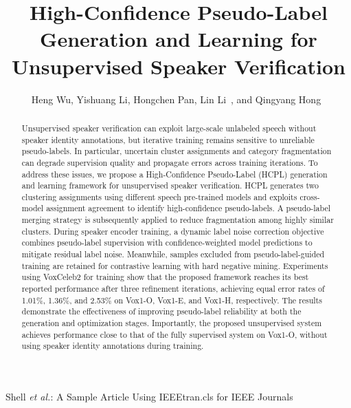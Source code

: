 \documentclass[lettersize,journal]{IEEEtran}
\begin{document}
\title{High-Confidence Pseudo-Label Generation and Learning for  Unsupervised Speaker Verification}

\author{Heng Wu, Yishuang Li, Hongchen Pan, Lin Li~, and Qingyang Hong~
}

%
{Shell \MakeLowercase{\textit{et al.}}: A Sample Article Using IEEEtran.cls for IEEE Journals}


\maketitle

\begin{abstract}
Unsupervised speaker verification can exploit large-scale unlabeled
speech without speaker identity annotations, but iterative training
remains sensitive to unreliable pseudo-labels. In particular,
uncertain cluster assignments and category fragmentation can degrade
supervision quality and propagate errors across training iterations.
To address these issues, we propose a High-Confidence Pseudo-Label
(HCPL) generation and learning framework for unsupervised speaker
verification.
HCPL generates two clustering assignments using different speech
pre-trained models and exploits cross-model assignment agreement to
identify high-confidence pseudo-labels. A pseudo-label merging
strategy is subsequently applied to reduce fragmentation among highly
similar clusters. During speaker encoder training, a dynamic label
noise correction objective combines pseudo-label supervision with
confidence-weighted model predictions to mitigate residual label
noise. Meanwhile, samples excluded from pseudo-label-guided training
are retained for contrastive learning with hard negative mining.
Experiments using VoxCeleb2 for training show that the proposed
framework reaches its best reported performance after three
refinement iterations, achieving equal error rates of 1.01\%,
1.36\%, and 2.53\% on Vox1-O, Vox1-E, and Vox1-H, respectively.
The results demonstrate the effectiveness of improving pseudo-label
reliability at both the generation and optimization stages.
Importantly, the proposed unsupervised system achieves performance
close to that of the fully supervised system on Vox1-O, without using
speaker identity annotations during training.
\end{abstract}
\end{document}
